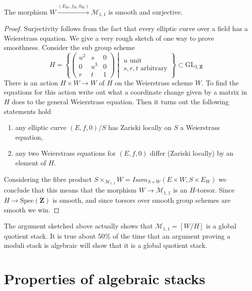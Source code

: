 \begin{lemma}
\label{lemma-Weierstrass-smooth-cover}
The morphism $W \xrightarrow{(E_W, f_W, 0_W)} \mathcal{M}_{1, 1}$ is smooth
and surjective.
\end{lemma}

\begin{proof}
Surjectivity follows from the fact that every elliptic curve over a
field has a Weierstrass equation. We give a very rough sketch of one
way to prove smoothness. Consider the sub group scheme
$$
H =
\left\{
\left(
\begin{matrix}
u^2 & s & 0 \\
0 & u^3 & 0 \\
r & t & 1
\end{matrix}
\right)
\middle|
\begin{matrix}
u\text{ unit} \\
s, r, t\text{ arbitrary}
\end{matrix}
\right\}
\subset
\text{GL}_{3, \mathbf{Z}}
$$
There is an action $H \times W \to W$ of $H$ on the Weierstrass scheme $W$.
To find the equations for this action write out what a coordinate change
given by a matrix in $H$ does to the general Weierstrass equation.
Then it turns out the following statements hold
\begin{enumerate}
\item any elliptic curve $(E, f, 0)/S$ has Zariski locally on $S$
a Weierstrass equation,
\item any two Weierstrass equations for $(E, f, 0)$ differ (Zariski locally)
by an element of $H$.
\end{enumerate}
Considering the fibre product
$S \times_{\mathcal{M}_{1, 1}} W =
\mathit{Isom}_{S \times W}(E \times W, S \times E_W)$
we conclude that this means that the morphism
$W \to \mathcal{M}_{1, 1}$ is an $H$-torsor.
Since $H \to \text{Spec}(\mathbf{Z})$ is smooth, and since torsors
over smooth group schemes are smooth we win.
\end{proof}

\begin{remark}
\label{remark-quotient-stack}
The argument sketched above actually shows that
$\mathcal{M}_{1, 1} = [W/H]$ is a global quotient stack.
It is true about 50\% of the time that an argument proving a moduli
stack is algebraic will show that it is a global quotient stack.
\end{remark}



\section{Properties of algebraic stacks}
\label{section-properties}

